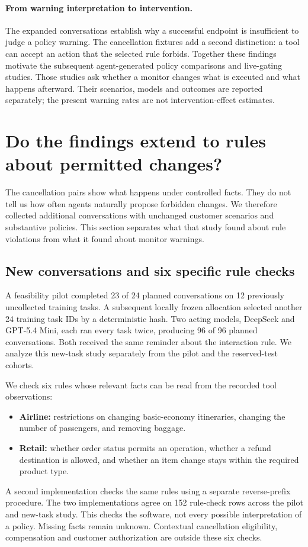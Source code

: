\paragraph{From warning interpretation to intervention.}
The expanded conversations establish why a successful endpoint is insufficient to judge a policy warning. The cancellation fixtures add a second distinction: a tool can accept an action that the selected rule forbids. Together these findings motivate the subsequent agent-generated policy comparisons and live-gating studies. Those studies ask whether a monitor changes what is executed and what happens afterward. Their scenarios, models and outcomes are reported separately; the present warning rates are not intervention-effect estimates.


\section{Do the findings extend to rules about permitted changes?}
\label{sec:substantive_extension}
The cancellation pairs show what happens under controlled facts. They do not tell us how often agents naturally propose forbidden changes. We therefore collected additional conversations with unchanged customer scenarios and substantive policies. This section separates what that study found about rule violations from what it found about monitor warnings.

\subsection{New conversations and six specific rule checks}
A feasibility pilot completed 23 of 24 planned conversations on 12 previously uncollected training tasks. A subsequent locally frozen allocation selected another 24 training task IDs by a deterministic hash. Two acting models, DeepSeek and GPT-5.4 Mini, each ran every task twice, producing 96 of 96 planned conversations. Both received the same reminder about the interaction rule. We analyze this new-task study separately from the pilot and the reserved-test cohorts.

We check six rules whose relevant facts can be read from the recorded tool observations:
\begin{itemize}
\item \textbf{Airline:} restrictions on changing basic-economy itineraries, changing the number of passengers, and removing baggage.
\item \textbf{Retail:} whether order status permits an operation, whether a refund destination is allowed, and whether an item change stays within the required product type.
\end{itemize}
A second implementation checks the same rules using a separate reverse-prefix procedure. The two implementations agree on 152 rule-check rows across the pilot and new-task study. This checks the software, not every possible interpretation of a policy. Missing facts remain unknown. Contextual cancellation eligibility, compensation and customer authorization are outside these six checks.

